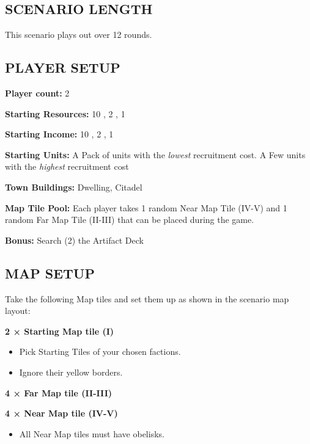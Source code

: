 
\begin{multicols*}{2}

\subsection*{\MakeUppercase{Scenario length}}

This scenario plays out over 12 rounds.

\subsection*{\MakeUppercase{Player setup}}

\textbf{Player count:} 2

\textbf{Starting Resources:} 10 , 2 , 1 

\textbf{Starting Income:} 10 , 2 , 1 

\textbf{Starting Units:} 
    A Pack of  units with the \textit{lowest} recruitment cost. 
    A Few  units with the \textit{highest} recruitment cost 

\textbf{Town Buildings:}  Dwelling, Citadel

\textbf{Map Tile Pool:} 
    Each player takes 1 random Near Map Tile (IV-V) and 1 random Far Map Tile (II-III)
    that can be placed during the game.

\textbf{Bonus:} Search (2) the Artifact Deck 

\subsection*{\MakeUppercase{Map setup}}

Take the following Map tiles and set them up as shown in the scenario map layout:

\textbf{2 × Starting Map tile (I)}
\begin{itemize}
    \item Pick Starting Tiles of your chosen factions.
    \item Ignore their yellow borders.
\end{itemize}

\textbf{4 × Far Map tile (II-III)}

\textbf{4 × Near Map tile (IV-V)}
\begin{itemize}
    \item All Near Map tiles must have obelisks.
\end{itemize}


\end{multicols*}
